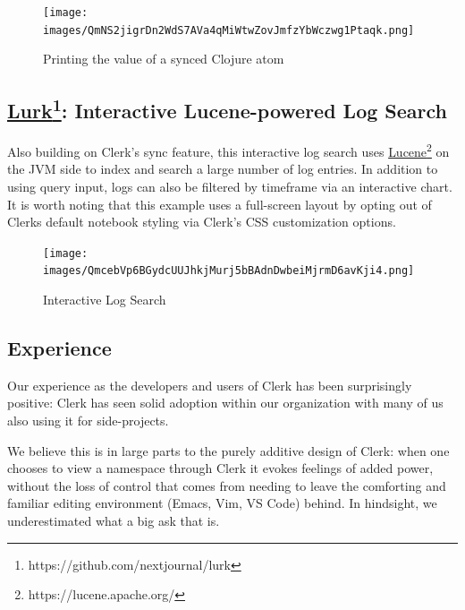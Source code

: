 \documentclass[sigconf,screen]{acmart}
\begin{document}
\begin{figure}
\hypertarget{printing-the-value-of-a-synced-clojure-atom}{%
\centering
\texttt{[image: images/QmNS2jigrDn2WdS7AVa4qMiWtwZovJmfzYbWczwg1Ptaqk.png]}
\caption{Printing the value of a synced Clojure atom}\label{printing-the-value-of-a-synced-clojure-atom}
}
\end{figure}

\hypertarget{lurk:-interactive-lucene-powered-log-search}{%
\subsection[: Interactive Lucene-powered Log Search]{\texorpdfstring{{\href{https://github.com/nextjournal/lurk}{Lurk}\footnote{https://github.com/nextjournal/lurk}}: Interactive Lucene-powered Log Search}{Lurk: Interactive Lucene-powered Log Search}}\label{lurk:-interactive-lucene-powered-log-search}}

Also building on Clerk's sync feature, this interactive log search uses {\href{https://lucene.apache.org/}{Lucene}\footnote{https://lucene.apache.org/}} on the JVM side to index and search a large number of log entries. In addition to using query input, logs can also be filtered by timeframe via an interactive chart. It is worth noting that this example uses a full-screen layout by opting out of Clerk\textquotesingle s default notebook styling via Clerk's CSS customization options.

\begin{figure}
\hypertarget{interactive-log-search}{%
\centering
\texttt{[image: images/QmcebVp6BGydcUUJhkjMurj5bBAdnDwbeiMjrmD6avKji4.png]}
\caption{Interactive Log Search}\label{interactive-log-search}
}
\end{figure}

\hypertarget{experience}{%
\subsection{Experience}\label{experience}}

Our experience as the developers and users of Clerk has been surprisingly positive: Clerk has seen solid adoption within our organization with many of us also using it for side-projects.

We believe this is in large parts to the purely additive design of Clerk: when one chooses to view a namespace through Clerk it evokes feelings of added power, without the loss of control that comes from needing to leave the comforting and familiar editing environment (Emacs, Vim, VS Code) behind. In hindsight, we underestimated what a big ask that is.
\end{document}
